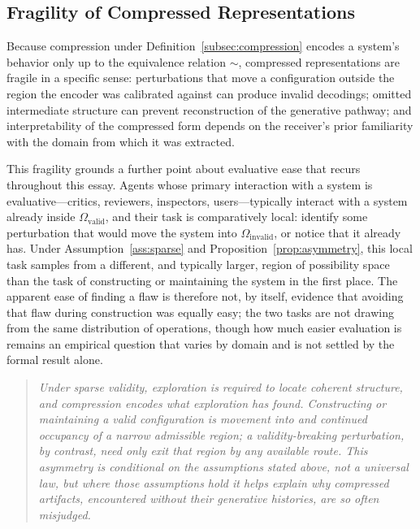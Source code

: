 \documentclass[12pt, a4paper]{article}
\theoremstyle{plain}
\theoremstyle{definition}
\theoremstyle{remark}
\begin{document}
\subsection{Fragility of Compressed Representations}
\label{subsec:fragility}

Because compression under Definition~\ref{subsec:compression} encodes a system's behavior only up to the equivalence relation $\sim$, compressed representations are fragile in a specific sense: perturbations that move a configuration outside the region the encoder was calibrated against can produce invalid decodings; omitted intermediate structure can prevent reconstruction of the generative pathway; and interpretability of the compressed form depends on the receiver's prior familiarity with the domain from which it was extracted.

This fragility grounds a further point about evaluative ease that recurs throughout this essay. Agents whose primary interaction with a system is evaluative---critics, reviewers, inspectors, users---typically interact with a system already inside $\Omega_{\mathrm{valid}}$, and their task is comparatively local: identify some perturbation that would move the system into $\Omega_{\mathrm{invalid}}$, or notice that it already has. Under Assumption~\ref{ass:sparse} and Proposition~\ref{prop:asymmetry}, this local task samples from a different, and typically larger, region of possibility space than the task of constructing or maintaining the system in the first place. The apparent ease of finding a flaw is therefore not, by itself, evidence that avoiding that flaw during construction was equally easy; the two tasks are not drawing from the same distribution of operations, though how much easier evaluation is remains an empirical question that varies by domain and is not settled by the formal result alone.

\begin{quote}
\itshape Under sparse validity, exploration is required to locate coherent structure, and compression encodes what exploration has found. Constructing or maintaining a valid configuration is movement into and continued occupancy of a narrow admissible region; a validity-breaking perturbation, by contrast, need only exit that region by any available route. This asymmetry is conditional on the assumptions stated above, not a universal law, but where those assumptions hold it helps explain why compressed artifacts, encountered without their generative histories, are so often misjudged.
\end{quote}
\end{document}
